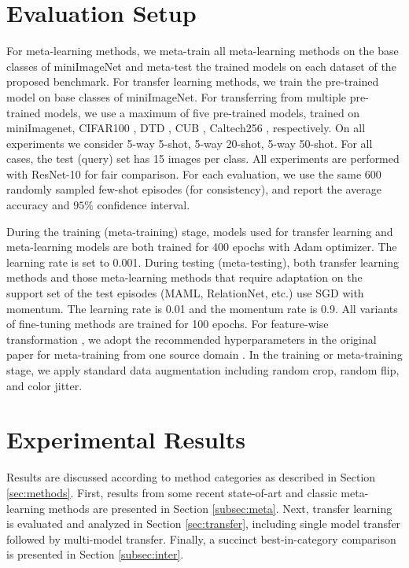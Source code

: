 \documentclass[runningheads]{llncs}
\begin{document}
\section{Evaluation Setup}
\label{sec:setup}
For meta-learning methods, we meta-train all meta-learning methods on the base classes of miniImageNet \cite{vinyals2016matching} and meta-test the trained models on each dataset of the proposed benchmark. For transfer learning methods, we train the pre-trained model on base classes of miniImageNet. For transferring from multiple pre-trained models, we use a maximum of five pre-trained models, trained on miniImagenet, CIFAR100 \cite{krizhevsky2009learning}, DTD \cite{cimpoi2014describing}, CUB \cite{WelinderEtal2010}, Caltech256 \cite{griffin2007caltech}, respectively. On all experiments we consider 5-way 5-shot, 5-way 20-shot, 5-way 50-shot. For all cases, the test (query) set has 15 images per class. All experiments are performed with ResNet-10 \cite{he2016deep} for fair comparison. For each evaluation, we use the same 600 randomly sampled few-shot episodes (for consistency), and report the average accuracy and $95\%$ confidence interval.  

 During the training (meta-training) stage, models used for transfer learning and meta-learning models are both trained for 400 epochs with Adam optimizer. The learning rate is set to 0.001. During testing (meta-testing), both transfer learning methods and those meta-learning methods that require adaptation on the support set of the test episodes (MAML, RelationNet, etc.) use SGD with momentum. The learning rate is 0.01 and the momentum rate is 0.9. All variants of fine-tuning methods are trained for 100 epochs. For feature-wise transformation \cite{tsengcrossdomain}, we adopt the recommended hyperparameters in the original paper for meta-training from one source domain . In the training or meta-training stage, we apply standard data augmentation including random crop, random flip, and color jitter.


\section{Experimental Results}

Results are discussed according to method categories as described in Section \ref{sec:methods}. First, results from some recent state-of-art and classic meta-learning methods are presented in Section \ref{subsec:meta}. Next, transfer learning is evaluated and analyzed in Section \ref{sec:transfer}, including single model transfer followed by multi-model transfer. Finally, a succinct best-in-category comparison is presented in Section \ref{subsec:inter}. 
\end{document}
